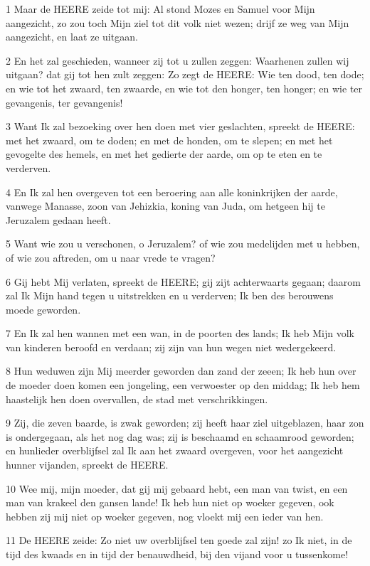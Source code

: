 \par 1 Maar de HEERE zeide tot mij: Al stond Mozes en Samuel voor Mijn aangezicht, zo zou toch Mijn ziel tot dit volk niet wezen; drijf ze weg van Mijn aangezicht, en laat ze uitgaan.
\par 2 En het zal geschieden, wanneer zij tot u zullen zeggen: Waarhenen zullen wij uitgaan? dat gij tot hen zult zeggen: Zo zegt de HEERE: Wie ten dood, ten dode; en wie tot het zwaard, ten zwaarde, en wie tot den honger, ten honger; en wie ter gevangenis, ter gevangenis!
\par 3 Want Ik zal bezoeking over hen doen met vier geslachten, spreekt de HEERE: met het zwaard, om te doden; en met de honden, om te slepen; en met het gevogelte des hemels, en met het gedierte der aarde, om op te eten en te verderven.
\par 4 En Ik zal hen overgeven tot een beroering aan alle koninkrijken der aarde, vanwege Manasse, zoon van Jehizkia, koning van Juda, om hetgeen hij te Jeruzalem gedaan heeft.
\par 5 Want wie zou u verschonen, o Jeruzalem? of wie zou medelijden met u hebben, of wie zou aftreden, om u naar vrede te vragen?
\par 6 Gij hebt Mij verlaten, spreekt de HEERE; gij zijt achterwaarts gegaan; daarom zal Ik Mijn hand tegen u uitstrekken en u verderven; Ik ben des berouwens moede geworden.
\par 7 En Ik zal hen wannen met een wan, in de poorten des lands; Ik heb Mijn volk van kinderen beroofd en verdaan; zij zijn van hun wegen niet wedergekeerd.
\par 8 Hun weduwen zijn Mij meerder geworden dan zand der zeeen; Ik heb hun over de moeder doen komen een jongeling, een verwoester op den middag; Ik heb hem haastelijk hen doen overvallen, de stad met verschrikkingen.
\par 9 Zij, die zeven baarde, is zwak geworden; zij heeft haar ziel uitgeblazen, haar zon is ondergegaan, als het nog dag was; zij is beschaamd en schaamrood geworden; en hunlieder overblijfsel zal Ik aan het zwaard overgeven, voor het aangezicht hunner vijanden, spreekt de HEERE.
\par 10 Wee mij, mijn moeder, dat gij mij gebaard hebt, een man van twist, en een man van krakeel den gansen lande! Ik heb hun niet op woeker gegeven, ook hebben zij mij niet op woeker gegeven, nog vloekt mij een ieder van hen.
\par 11 De HEERE zeide: Zo niet uw overblijfsel ten goede zal zijn! zo Ik niet, in de tijd des kwaads en in tijd der benauwdheid, bij den vijand voor u tussenkome!
